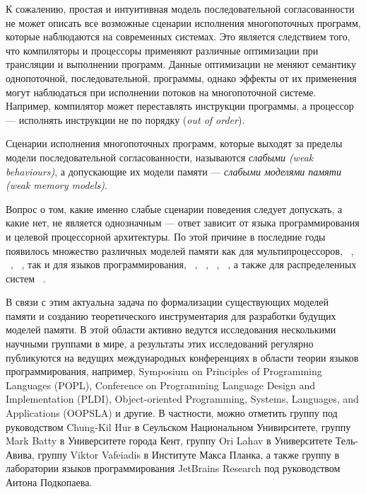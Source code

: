 К сожалению, простая и интуитивная модель последовательной согласованности 
не может описать все возможные сценарии исполнения многопоточных программ, 
которые наблюдаются на современных системах.
Это является следствием того, что компиляторы и процессоры применяют 
различные оптимизации при трансляции и выполнении программ.
Данные оптимизации не меняют семантику однопоточной, последовательной, программы, 
однако эффекты от их применения могут наблюдаться при исполнении потоков на многопоточной системе.
Например, компилятор может переставлять инструкции программы, 
а процессор --- исполнять инструкции не по порядку (\emph{out of order}).

Сценарии исполнения многопоточных программ, 
которые выходят за пределы модели последовательной согласованности,
называются \emph{слабыми (weak behaviours)}, а допускающие их модели памяти ---
\emph{слабыми моделями памяти (weak memory models)}.

Вопрос о том, какие именно слабые сценарии поведения 
следует допускать, а какие нет, не является однозначным --- ответ  
зависит от языка программирования и целевой процессорной архитектуры.
По этой причине в последние годы появилось множество
различных моделей памяти как для мультипроцессоров, \Intel~\autocite{Sewell-al:CACM10}, 
\ARM~\autocite{Pulte-al:POPL18}, 
\POWER~\autocite{Sarkar-al:PLDI11}, так и для языков программирования,
\CPP~\autocite{Batty-al:POPL11},
\Java~\autocite{Manson-al:POPL05}, 
\JS~\autocite{Watt-al:PLDI2020}, 
\OCaml~\autocite{Dolan-al:PLDI18},
а также для распределенных систем%
~\autocite{Jagadeesan-al:ESOP2018,Lahav-Boker:PLDI2020}.

В связи с этим актуальна задача по формализации 
существующих моделей памяти и созданию теоретического инструментария
для разработки будущих моделей памяти.
В этой области активно ведутся исследования несколькими научными группами в мире,
а результаты этих исследований регулярно публикуются на ведущих
международных конференциях в области теории языков программирования,
например, Symposium on Principles of Programming Languages (POPL),
Conference on Programming Language Design and Implementation (PLDI),
Object-oriented Programming, Systems, Languages, and Applications (OOPSLA) и другие. 
В частности, можно отметить
группу под руководством Chung-Kil Hur в Сеульском Национальном Унивирситете,
группу Mark Batty в Университете города Кент,
группу Ori Lahav в Университете Тель-Авива,
группу Viktor Vafeiadis в Институте Макса Планка,
а также группу в лаборатории языков программирования JetBrains Research
под руководством Антона Подкопаева.

